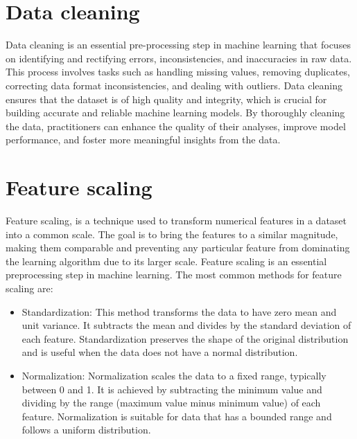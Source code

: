 \documentclass[
]{book}
\begin{document}
\hypertarget{data-cleaning-1}{%
\section{\texorpdfstring{Data cleaning\\
}{Data cleaning }}\label{data-cleaning-1}}

Data cleaning is an essential pre-processing step in machine learning that focuses on identifying and rectifying errors, inconsistencies, and inaccuracies in raw data. This process involves tasks such as handling missing values, removing duplicates, correcting data format inconsistencies, and dealing with outliers. Data cleaning ensures that the dataset is of high quality and integrity, which is crucial for building accurate and reliable machine learning models. By thoroughly cleaning the data, practitioners can enhance the quality of their analyses, improve model performance, and foster more meaningful insights from the data.

\hypertarget{feature-scaling}{%
\section{\texorpdfstring{Feature scaling\\
}{Feature scaling }}\label{feature-scaling}}

Feature scaling, is a technique used to transform numerical features in a dataset into a common scale. The goal is to bring the features to a similar magnitude, making them comparable and preventing any particular feature from dominating the learning algorithm due to its larger scale. Feature scaling is an essential preprocessing step in machine learning.
The most common methods for feature scaling are:

\begin{itemize}
\item
  Standardization: This method transforms the data to have zero mean and unit variance. It subtracts the mean and divides by the standard deviation of each feature. Standardization preserves the shape of the original distribution and is useful when the data does not have a normal distribution.
\item
  Normalization: Normalization scales the data to a fixed range, typically between 0 and 1. It is achieved by subtracting the minimum value and dividing by the range (maximum value minus minimum value) of each feature. Normalization is suitable for data that has a bounded range and follows a uniform distribution.
\end{itemize}
\end{document}
